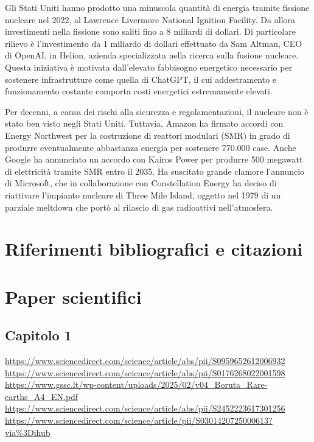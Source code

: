 \documentclass[12pt,a4paper,oneside]{book}
\begin{document}
Gli Stati Uniti hanno prodotto una minuscola quantità di energia tramite fissione nucleare nel 2022, al Lawrence Livermore National Ignition Facility. Da allora investimenti nella fissione sono saliti fino a 8 miliardi di dollari. Di particolare rilievo è l'investimento da 1 miliardo di dollari effettuato da Sam Altman, CEO di OpenAI, in Helion, azienda specializzata nella ricerca sulla fusione nucleare. Questa iniziativa è motivata dall'elevato fabbisogno energetico necessario per sostenere infrastrutture come quella di ChatGPT, il cui addestramento e funzionamento costante comporta costi energetici estremamente elevati.

Per decenni, a causa dei rischi alla sicurezza e regolamentazioni, il nucleare non è stato ben visto negli Stati Uniti. Tuttavia, Amazon ha firmato accordi con Energy Northwest per la costruzione di reattori modulari (SMR) in grado di produrre eventualmente abbastanza energia per sostenere 770.000 case. Anche Google ha annunciato un accordo con Kairos Power per produrre 500 megawatt di elettricità tramite SMR entro il 2035.
Ha suscitato grande clamore l'annuncio di Microsoft, che in collaborazione con Constellation Energy ha deciso di riattivare l'impianto nucleare di Three Mile Island, oggetto nel 1979 di un parziale meltdown che portò al rilascio di gas radioattivi nell'atmosfera.


\newpage
\renewcommand{\bibsection}{}
\section*{Riferimenti bibliografici e citazioni}
\nocite{*}


\section*{Paper scientifici}
\subsection*{Capitolo 1}
\sloppy          %

\url{https://www.sciencedirect.com/science/article/abs/pii/S0959652612006932} \\
\url{https://www.sciencedirect.com/science/article/abs/pii/S0176268022001598} \\
\url{https://www.gssc.lt/wp-content/uploads/2025/02/v04_Boruta_Rare-earths_A4_EN.pdf} \\
\url{https://www.sciencedirect.com/science/article/abs/pii/S2452223617301256} \\
\url{https://www.sciencedirect.com/science/article/pii/S0301420725000613?via%3Dihub}
\end{document}
